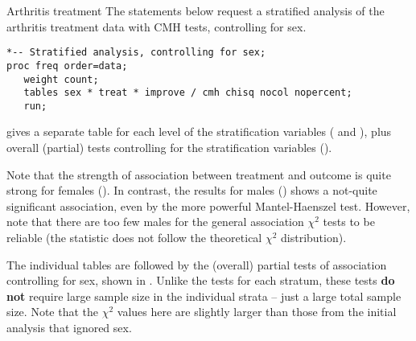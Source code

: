 \begin{Example}[arthrit3]{Arthritis treatment}
The statements below request a stratified analysis of the arthritis
treatment data
with CMH tests,
controlling for sex.

{\small
\begin{verbatim}
*-- Stratified analysis, controlling for sex;
proc freq order=data;
   weight count;
   tables sex * treat * improve / cmh chisq nocol nopercent;
   run;
\end{verbatim}
}

 gives a separate table for each level of the stratification
variables ( and ), plus overall (partial) tests controlling for the
stratification variables ().

\begin{Output}[htb]
\caption{Arthritis treatment data, stratified analysis}\label{out:arthfreq.3}
\small

\end{Output}

Note that the strength of
association%
between treatment and outcome is quite
strong for females ().  In contrast, the results for males () shows
a not-quite significant association, even by the 
more powerful Mantel-Haenszel test.
However,
note that there are too few males for the general association
\(\chi^2\) tests to be reliable (the statistic does not follow the
theoretical \(\chi^2\) distribution).
\begin{Output}[htb]
\caption{Arthritis treatment data, stratified analysis}\label{out:arthfreq.4}
\small

\end{Output}

The individual tables are followed by the (overall) partial tests of
association controlling for sex, shown in .  Unlike the tests for each stratum,
these tests {\bf do not} require large sample size in the individual
strata -- just a large total sample size.  Note that the \(\chi^2\)
values here are slightly larger than those from the initial analysis
that ignored sex.

\begin{Output}[htb]
\caption{Arthritis treatment data, stratified analysis}\label{out:arthfreq.5}
\small

\end{Output}
\end{Example}

